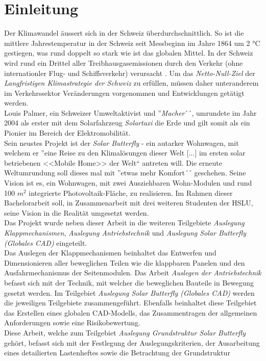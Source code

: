 \section{Einleitung}
Der Klimawandel äussert sich in der Schweiz überdurchschnittlich. So ist die mittlere Jahrestemperatur in der Schweiz seit Messbeginn im Jahre 1864 um 2 °C gestiegen, was rund doppelt so stark wie ist das globalen Mittel. In der Schweiz wird rund ein Drittel aller Treibhausgasemissionen durch den Verkehr (ohne internationler Flug- und Schiffsverkehr) verursacht \cite{BAFU}. Um das \emph{Netto-Null-Ziel} der \emph{Langfristigen Klimastrategie der Schweiz} zu erfüllen, müssen daher unteranderem im Verkehrssektor Veränderungen vorgenommen und Entwicklungen getätigt werden.\\
Louis Palmer, ein Schweizer Umweltaktivist und ''\emph{Macher}´´, umrundete im Jahr 2004 als erster mit dem Solarfahrzeug \emph{Solartaxi} die Erde und gilt somit als ein Pionier im Bereich der Elektromobilität.\\
Sein neustes Projekt ist der \emph{Solar Butterfly} - ein autarker Wohnwagen, mit welchem er ''eine Reise zu den Klimalösungen dieser Welt [...] im ersten solar betriebenen <<Mobile Home>> der Welt`` antreten will. Die erneute Weltumrundung soll dieses mal mit ''etwas mehr Komfort´´ geschehen. Seine Vision ist es, ein Wohnwagen, mit zwei Ausziehbaren Wohn-Modulen und rund 100 $m^2$ integrierte Photovoltaik-Fläche, zu realisieren. Im Rahmen dieser Bachelorarbeit soll, in Zusammenarbeit mit drei weiteren Studenten der HSLU, seine Vision in die Realität umgesetzt werden.\\
Das Projekt wurde neben dieser Arbeit in die weiteren Teilgebiete \emph{Auslegung Klappmechanismen}, \emph{Auslegung Antriebstechnik} und \emph{Auslegung Solar Butterfly (Globales CAD)} eingeteilt.\\
Das Auslegen der Klappmechanismen beinhaltet das Entwerfen und Dimensionieren aller beweglichen Teilen wie die klappbaren Panelen und den Ausfahrmechanismus der Seitenmodulen. Das Arbeit \emph{Auslegen der Antriebstechnik} befasst sich mit der Technik, mit welcher die beweglichen Bauteile in Bewegung gesetzt werden. Im Teilgebiet \emph{Auslegung Solar Butterfly (Globales CAD)} werden die jeweiligen Teilgebiete zusammengeführt. Ebenfalls beinhaltet diese Teilgebiet das Erstellen eines globalen CAD-Modells, das Zusammentragen der allgemeinen Anforderungen sowie eine Risikobewertung.\\
Diese Arbeit, welche zum Teilgebiet \emph{Auslegung Grundstruktur Solar Butterfly} gehört, befasst sich mit der Festlegung der Auslegungskriterien, der Ausarbeitung eines detailierten Lastenheftes sowie die Betrachtung der Grundstruktur

